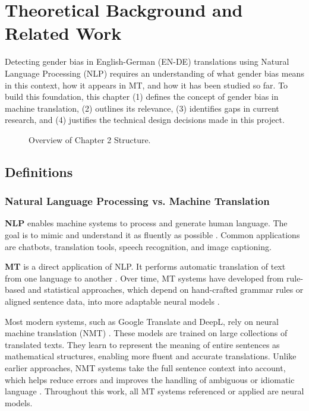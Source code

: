 \chapter{Theoretical Background and Related Work}
Detecting gender bias in English-German (EN-DE) translations using Natural Language Processing (NLP) requires an understanding of what gender bias means in this context, how it appears in MT, and how it has been studied so far. To build this foundation, this chapter (1) defines the concept of gender bias in machine translation, (2) outlines its relevance, (3) identifies gaps in current research, and (4) justifies the technical design decisions made in this project.

\vspace{1cm} 
\begin{figure}[htb]
    \centering
    \scalebox{0.8}{}
    \caption{Overview of Chapter 2 Structure.}
    \label{fig:workflow_theory}
\end{figure}
\vspace{1cm} 


\section{Definitions}
\subsection{Natural Language Processing vs. Machine Translation}
    \textbf{NLP} enables machine systems to process and generate human language. The goal is to mimic and understand it as fluently as possible \parencite{smacchiaDoesAIReflect2024,ullmannGenderBiasMachine2022}. Common applications are chatbots, translation tools, speech recognition, and image captioning.

    \textbf{MT} is a direct application of NLP. It performs automatic translation of text from one language to another \parencite{linMachineTranslationAcademic2009}. Over time, MT systems have developed from rule-based and statistical approaches, which depend on hand-crafted grammar rules or aligned sentence data, into more adaptable neural models \parencite{chakravarthiSurveyOrthographicInformation2021}.

    Most modern systems, such as Google Translate and DeepL, rely on neural machine translation (NMT) \parencite{wuGooglesNeuralMachine2016,deeplHowDoesDeepL2021}. These models are trained on large collections of translated texts. They learn to represent the meaning of entire sentences as mathematical structures, enabling more fluent and accurate translations. Unlike earlier approaches, NMT systems take the full sentence context into account, which helps reduce errors and improves the handling of ambiguous or idiomatic language \parencite{wuGooglesNeuralMachine2016}. Throughout this work, all MT systems referenced or applied are neural models.

